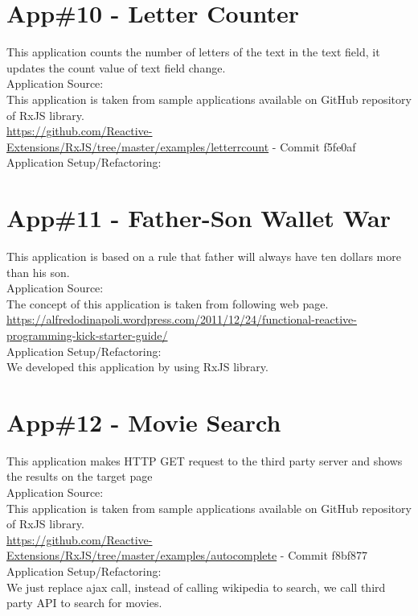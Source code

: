 \section{App\#10 - Letter Counter}
This application counts the number of letters of the text in the text field, it updates the count value of text field change.\\
Application Source: \\
This application is taken from sample applications available on GitHub repository of RxJS library.\\
\url{https://github.com/Reactive-Extensions/RxJS/tree/master/examples/letterrcount} - Commit f5fe0af\\
Application Setup/Refactoring: \\


\section{App\#11 - Father-Son Wallet War}
This application is based on a rule that father will always have ten dollars more than his son.\\
Application Source: \\
The concept of this application is taken from following web page.\\
\url{https://alfredodinapoli.wordpress.com/2011/12/24/functional-reactive-programming-kick-starter-guide/
}\\
Application Setup/Refactoring: \\
We developed this application by using RxJS library.


\section{App\#12 - Movie Search}
This application makes HTTP GET request to the third party server and shows the results on the target page\\
Application Source: \\
This application is taken from sample applications available on GitHub repository of RxJS library.\\
\url{https://github.com/Reactive-Extensions/RxJS/tree/master/examples/autocomplete} - Commit f8bf877\\
Application Setup/Refactoring: \\
We just replace ajax call, instead of calling wikipedia to search, we call third party API to search for movies.


